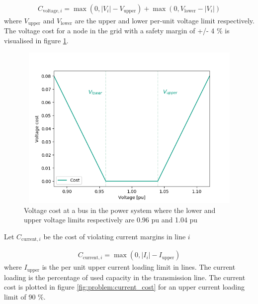 \documentclass[class=book, crop=false, 11pt]{standalone}
\begin{document}
\begin{equation}
   \begin{aligned}
   \label{eq:problem:voltage_margins_cost}
    C_{\textrm{voltage},i} = \max(0,|V_{i}| - V_{\textrm{upper}}) + \max(0,V_{\textrm{lower}}- |V_{i}|)
    \end{aligned} 
\end{equation}
where $V_{\textrm{upper}}$ and $V_{\textrm{lower}}$ are the upper and lower per-unit voltage limit respectively. The voltage cost for a node in the grid with a safety margin of +/- 4 \%  is visualised in figure \ref{fig:problem:voltage_cost}.
\begin{figure}[ht]
    \center
\includegraphics[height=8cm, width=12cm]{figures/voltage_cost.png}
    \caption[size = 9]{Voltage cost at a bus in the power system where the lower and upper voltage limits respectively are 0.96 pu and 1.04 pu }
    \label{fig:problem:voltage_cost}
\end{figure}

Let $C_{\textrm{current},i}$ be the cost of violating current margins in line $i$

\begin{equation}
   \begin{aligned}
   \label{eq:problem:current_margins_cost}
    C_{\textrm{current},i} = \max(0,|I_{i}| - I_{\textrm{upper}})
    \end{aligned} 
\end{equation}
where $I_{\textrm{upper}}$ is the per unit upper current loading limit in lines. The current loading is the percentage of used capacity in the transmission line. The current cost is plotted in figure  \ref{fig:problem:current_cost} for an upper current loading limit of 90 \%.
\end{document}
